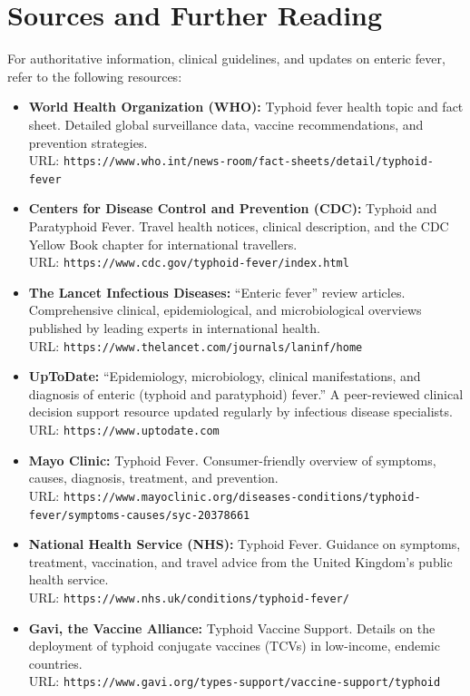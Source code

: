 \section*{Sources and Further Reading}
For authoritative information, clinical guidelines, and updates on enteric fever, refer to the following resources:
\begin{itemize}
\item \textbf{World Health Organization (WHO):} Typhoid fever health topic and fact sheet. Detailed global surveillance data, vaccine recommendations, and prevention strategies. \\ URL: \texttt{https://www.who.int/news-room/fact-sheets/detail/typhoid-fever}
\item \textbf{Centers for Disease Control and Prevention (CDC):} Typhoid and Paratyphoid Fever. Travel health notices, clinical description, and the CDC Yellow Book chapter for international travellers. \\ URL: \texttt{https://www.cdc.gov/typhoid-fever/index.html}
\item \textbf{The Lancet Infectious Diseases:} ``Enteric fever'' review articles. Comprehensive clinical, epidemiological, and microbiological overviews published by leading experts in international health. \\ URL: \texttt{https://www.thelancet.com/journals/laninf/home}
\item \textbf{UpToDate:} ``Epidemiology, microbiology, clinical manifestations, and diagnosis of enteric (typhoid and paratyphoid) fever.'' A peer-reviewed clinical decision support resource updated regularly by infectious disease specialists. \\ URL: \texttt{https://www.uptodate.com}
\item \textbf{Mayo Clinic:} Typhoid Fever. Consumer-friendly overview of symptoms, causes, diagnosis, treatment, and prevention. \\ URL: \texttt{https://www.mayoclinic.org/diseases-conditions/typhoid-fever/symptoms-causes/syc-20378661}
\item \textbf{National Health Service (NHS):} Typhoid Fever. Guidance on symptoms, treatment, vaccination, and travel advice from the United Kingdom's public health service. \\ URL: \texttt{https://www.nhs.uk/conditions/typhoid-fever/}
\item \textbf{Gavi, the Vaccine Alliance:} Typhoid Vaccine Support. Details on the deployment of typhoid conjugate vaccines (TCVs) in low-income, endemic countries. \\ URL: \texttt{https://www.gavi.org/types-support/vaccine-support/typhoid}
\end{itemize}
